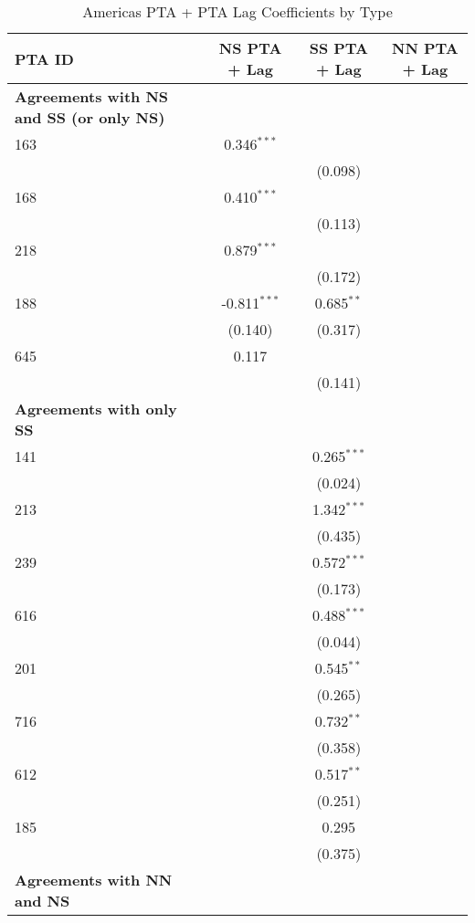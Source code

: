 \begin{table}[htbp]
    \centering
    \caption{Americas PTA + PTA Lag Coefficients by Type}
    \label{tab:americas_pta}
    \begin{adjustbox}{max width=\textwidth}
    \begin{tabular}{lccc}
    \hline
    \textbf{PTA ID} & \textbf{NS PTA + Lag} & \textbf{SS PTA + Lag} & \textbf{NN PTA + Lag} \\
    \hline
    \textbf{Agreements with NS and SS (or only NS)} &  &  &  \\
    \hline
    163 & 0.346$^{\ast\ast\ast}$ &  &  \\
    &  & (0.098) &  \\
    168 & 0.410$^{\ast\ast\ast}$ &  &  \\
    &  & (0.113) &  \\
    218 & 0.879$^{\ast\ast\ast}$ &  &  \\
    &  & (0.172) &  \\
    188 & -0.811$^{\ast\ast\ast}$ & 0.685$^{\ast\ast}$ &  \\
    & (0.140) & (0.317) & \\
    645 & 0.117 &  &  \\
    &  & (0.141) &  \\
    \hline
    \textbf{Agreements with only SS} &  &  &  \\
    \hline
    141 &  & 0.265$^{\ast\ast\ast}$ &  \\
    &  & (0.024) &  \\
    213 &  & 1.342$^{\ast\ast\ast}$ &  \\
    &  & (0.435) &  \\
    239 &  & 0.572$^{\ast\ast\ast}$ &  \\
    &  & (0.173) &  \\
    616 &  & 0.488$^{\ast\ast\ast}$ &  \\
    &  & (0.044) &  \\
    201 &  & 0.545$^{\ast\ast}$ &  \\
    &  & (0.265) &  \\
    716 &  & 0.732$^{\ast\ast}$ &  \\
    &  & (0.358) &  \\
    612 &  & 0.517$^{\ast\ast}$ &  \\
    &  & (0.251) &  \\
    185 &  & 0.295 &  \\
    &  & (0.375) &  \\
    \hline
    \textbf{Agreements with NN and NS} &  &  &  \\

\end{tabular}
\end{adjustbox}
\end{table}
